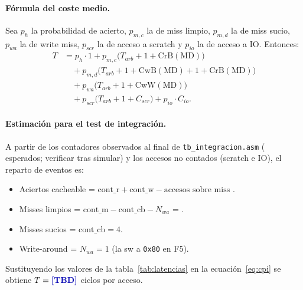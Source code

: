 \paragraph{F\'ormula del coste medio.} Sea $p_h$ la probabilidad de acierto,
$p_{m,c}$ la de miss limpio, $p_{m,d}$ la de miss sucio, $p_{wa}$ la de write
miss, $p_\textit{scr}$ la de acceso a scratch y $p_\textit{io}$ la de acceso
a IO. Entonces:
\begin{align}
T &= p_h\cdot 1
   + p_{m,c}\bigl(T_\textit{arb} + 1 + \mathrm{CrB(MD)}\bigr) \nonumber \\
  &\quad + p_{m,d}\bigl(T_\textit{arb} + 1 + \mathrm{CwB(MD)} + 1 + \mathrm{CrB(MD)}\bigr) \nonumber \\
  &\quad + p_{wa}\bigl(T_\textit{arb} + 1 + \mathrm{CwW(MD)}\bigr) \nonumber \\
  &\quad + p_\textit{scr}\bigl(T_\textit{arb} + 1 + C_\textit{scr}\bigr)
   + p_\textit{io}\cdot C_\textit{io}.
\label{eq:cpi}
\end{align}

\paragraph{Estimaci\'on para el test de integraci\'on.}
A partir de los contadores observados al final de \texttt{tb\_integracion.asm}
( esperados; verificar tras
simular) y los accesos no contados (scratch e IO), el reparto de eventos es:
\begin{itemize}[leftmargin=1.2em]
  \item Aciertos cacheable = $\mathrm{cont\_r}+\mathrm{cont\_w} - \text{accesos sobre miss}$ .
  \item Misses limpios = $\mathrm{cont\_m}-\mathrm{cont\_cb}-N_\textit{wa}$ = .
  \item Misses sucios = $\mathrm{cont\_cb}=4$.
  \item Write-around = $N_\textit{wa}=1$ (la sw a \texttt{0x80} en F5).
\end{itemize}

Sustituyendo los valores de la tabla~\ref{tab:latencias} en la
ecuaci\'on~\eqref{eq:cpi} se obtiene $T = \dato{TBD}$ ciclos por acceso.
